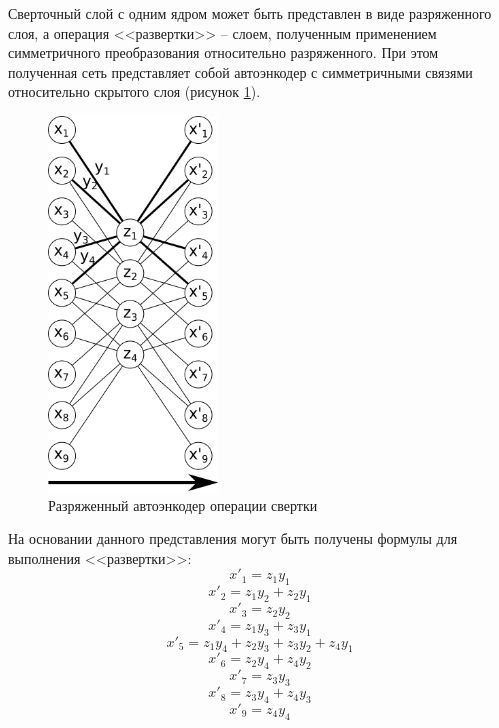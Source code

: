 Сверточный слой с одним ядром может быть представлен в виде разряженного слоя, а операция <<развертки>> -- слоем, полученным применением симметричного преобразования относительно разряженного. При этом полученная сеть представляет собой автоэнкодер с симметричными связями относительно скрытого слоя (рисунок \ref{fig:convolution_autoencoder}).

\begin{figure}[H]
  \centering
  \includegraphics[width=0.4\textwidth]{man-source/images/ch2/pic2-5.png}
  \caption{Разряженный автоэнкодер операции свертки}
  \label{fig:convolution_autoencoder}
\end{figure}

На основании данного представления могут быть получены формулы для выполнения <<развертки>>:
\begin{equation*}
	x'_1 = z_1y_1		
	\end{equation*}
	\begin{equation*}
	x'_2 = z_1y_2+z_2y_1
	\end{equation*}
	\begin{equation*}
	x'_3 = z_2y_2
	\end{equation*}
	\begin{equation*}
	x'_4 = z_1y_3 + z_3y_1
	\end{equation*}
	\begin{equation*}
	x'_5 = z_1y_4 + z_2y_3 + z_3y_2 + z_4y_1
	\end{equation*}
	\begin{equation*}
	x'_6 = z_2y_4 + z_4y_2
	\end{equation*}
	\begin{equation*}
	x'_7 = z_3y_3
	\end{equation*}
	\begin{equation*}
	x'_8 = z_3y_4 + z_4y_3
	\end{equation*}		
	\begin{equation*}
	x'_9 = z_4y_4
	\end{equation*}	

